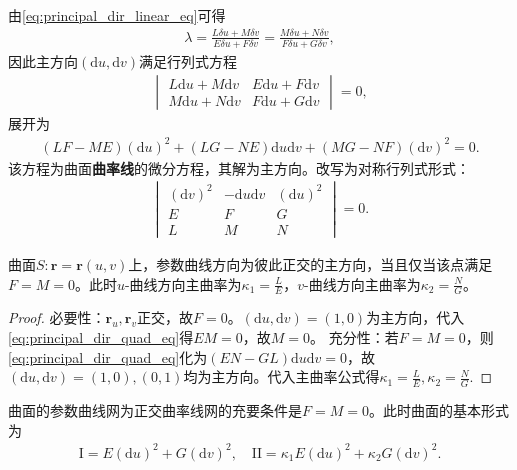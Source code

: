 \documentclass[../../main.tex]{subfiles}%
\begin{document}
由\eqref{eq:principal_dir_linear_eq}可得
\begin{align*}
\lambda=\frac{L\delta u+M\delta v}{E\delta u+F\delta v}=\frac{M\delta u+N\delta v}{F\delta u+G\delta v},
\end{align*}
因此主方向$(\mathrm{d}u,\mathrm{d}v)$满足行列式方程
\begin{align}
\begin{vmatrix}
L\mathrm{d}u+M\mathrm{d}v & E\mathrm{d}u+F\mathrm{d}v\\
M\mathrm{d}u+N\mathrm{d}v & F\mathrm{d}u+G\mathrm{d}v
\end{vmatrix}=0,\label{eq:principal_dir_det_eq}
\end{align}
展开为
\begin{align}
(LF-ME)(\mathrm{d}u)^2+(LG-NE)\mathrm{d}u\mathrm{d}v+(MG-NF)(\mathrm{d}v)^2=0.\label{eq:principal_dir_quad_eq}
\end{align}
该方程为曲面\textbf{曲率线}的微分方程，其解为主方向。改写为对称行列式形式：
\begin{align}
\begin{vmatrix}
(\mathrm{d}v)^2 & -\mathrm{d}u\mathrm{d}v & (\mathrm{d}u)^2\\
E & F & G\\
L & M & N
\end{vmatrix}=0.\label{eq:curvature_line_diff_eq}
\end{align}

\begin{theorem}
曲面$S:\boldsymbol{r}=\boldsymbol{r}(u,v)$上，参数曲线方向为彼此正交的主方向，当且仅当该点满足$F=M=0$。此时$u$-曲线方向主曲率为$\kappa_1=\frac{L}{E}$，$v$-曲线方向主曲率为$\kappa_2=\frac{N}{G}$。
\end{theorem}
\begin{proof}
必要性：$\boldsymbol{r}_u,\boldsymbol{r}_v$正交，故$F=0$。$(\mathrm{d}u,\mathrm{d}v)=(1,0)$为主方向，代入\eqref{eq:principal_dir_quad_eq}得$EM=0$，故$M=0$。
充分性：若$F=M=0$，则\eqref{eq:principal_dir_quad_eq}化为$(EN-GL)\mathrm{d}u\mathrm{d}v=0$，故$(\mathrm{d}u,\mathrm{d}v)=(1,0),(0,1)$均为主方向。代入主曲率公式得$\kappa_1=\frac{L}{E},\kappa_2=\frac{N}{G}$.
\end{proof}

\begin{corollary}
曲面的参数曲线网为正交曲率线网的充要条件是$F=M=0$。此时曲面的基本形式为
\begin{align}
\mathrm{I}=E(\mathrm{d}u)^2+G(\mathrm{d}v)^2,\quad \mathrm{II}=\kappa_1E(\mathrm{d}u)^2+\kappa_2G(\mathrm{d}v)^2.\label{eq:ortho_curvature_line_form}
\end{align}
\end{corollary}
\end{document}

